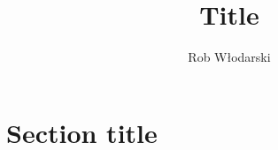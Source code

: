 \documentclass[11pt]{article}
\begin{document}
\title{\Large \bfseries \vspace{-5mm} Title \vspace{-5mm}}
\author{Rob Włodarski}
\date{}
\maketitle

\tableofcontents
\newpage

\section{Section title}

% 


\printbibliography
\end{document}
